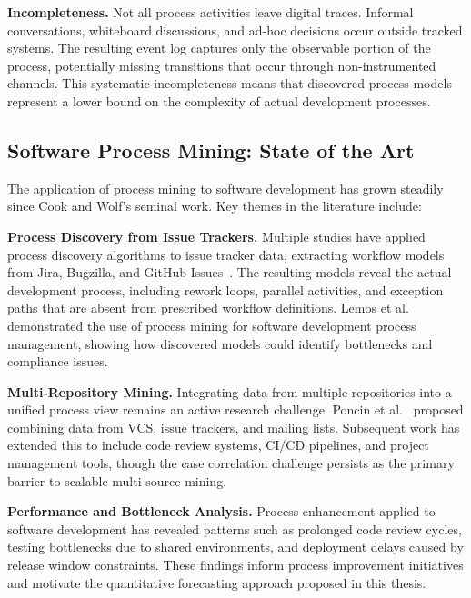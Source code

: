 \textbf{Incompleteness.} Not all process activities leave digital traces.
Informal conversations, whiteboard discussions, and ad-hoc decisions
occur outside tracked systems. The resulting event log captures only the
observable portion of the process, potentially missing transitions that
occur through non-instrumented channels. This systematic incompleteness
means that discovered process models represent a lower bound on the
complexity of actual development processes.


\subsection{Software Process Mining: State of the Art}
\label{sec:software-pm-sota}

The application of process mining to software development has grown
steadily since Cook and Wolf's seminal work. Key themes in the literature
include:

\textbf{Process Discovery from Issue Trackers.} Multiple studies have
applied process discovery algorithms to issue tracker data, extracting
workflow models from Jira, Bugzilla, and GitHub Issues~\cite{Caldeira2019AssessingSoftwareTeams,lemos2011using}. The resulting models
reveal the actual development process, including rework loops, parallel
activities, and exception paths that are absent from prescribed workflow
definitions. Lemos et al.~\cite{lemos2011using} demonstrated the use of
process mining for software development process management, showing how
discovered models could identify bottlenecks and compliance issues.

\textbf{Multi-Repository Mining.} Integrating data from multiple
repositories into a unified process view remains an active research
challenge. Poncin et al.~\cite{poncin2011process} proposed combining
data from VCS, issue trackers, and mailing lists. Subsequent work has
extended this to include code review systems, CI/CD pipelines, and
project management tools, though the case correlation challenge persists
as the primary barrier to scalable multi-source mining.

\textbf{Performance and Bottleneck Analysis.} Process enhancement
applied to software development has revealed patterns such as prolonged
code review cycles, testing bottlenecks due to shared environments, and
deployment delays caused by release window constraints. These findings
inform process improvement initiatives and motivate the quantitative
forecasting approach proposed in this thesis.

